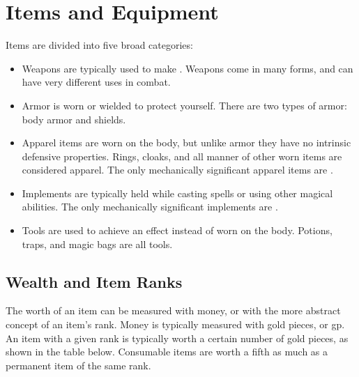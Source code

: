 \chapter{Items and Equipment}\label{Items and Equipment}

Items are divided into five broad categories:
\begin{itemize}
  \item Weapons are typically used to make .
    Weapons come in many forms, and can have very different uses in combat.
  \item Armor is worn or wielded to protect yourself.
    There are two types of armor: body armor and shields.
  \item Apparel items are worn on the body, but unlike armor they have no intrinsic defensive properties.
    Rings, cloaks, and all manner of other worn items are considered apparel.
    The only mechanically significant apparel items are \magical.
  \item Implements are typically held while casting spells or using other magical abilities.
    The only mechanically significant implements are \magical.
  \item Tools are used to achieve an effect instead of worn on the body.
    Potions, traps, and magic bags are all tools.
\end{itemize}

\section{Wealth and Item Ranks}\label{Wealth}\label{Wealth and Item Ranks}
  The worth of an item can be measured with money, or with the more abstract concept of an item's rank.
  Money is typically measured with gold pieces, or gp.
  An item with a given rank is typically worth a certain number of gold pieces, as shown in the table below.
  Consumable items are worth a fifth as much as a permanent item of the same rank.

